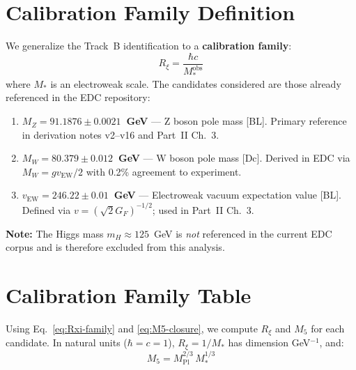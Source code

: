 \documentclass[11pt,a4paper]{article}
\newcommand{\Rxi}{R_\xi}
\newcommand{\Mpl}{M_{\mathrm{Pl}}}
\newcommand{\Mfive}{M_5}
\newcommand{\MZ}{M_Z}
\newcommand{\MW}{M_W}
\newcommand{\vEW}{v_{\mathrm{EW}}}
\begin{document}
\section{Calibration Family Definition}

We generalize the Track~B identification to a \textbf{calibration family}:
\begin{equation}
\Rxi = \frac{\hbar c}{M_*^{\mathrm{obs}}}
\label{eq:Rxi-family}
\end{equation}
where $M_*$ is an electroweak scale. The candidates considered are those already
referenced in the EDC repository:

\begin{enumerate}
\item \textbf{$\MZ = 91.1876 \pm 0.0021$~GeV} --- Z boson pole mass [BL].
      Primary reference in derivation notes v2--v16 and Part~II Ch.~3.
\item \textbf{$\MW = 80.379 \pm 0.012$~GeV} --- W boson pole mass [Dc].
      Derived in EDC via $\MW = g \vEW / 2$ with 0.2\% agreement to experiment.
\item \textbf{$\vEW = 246.22 \pm 0.01$~GeV} --- Electroweak vacuum expectation value [BL].
      Defined via $v = (\sqrt{2} G_F)^{-1/2}$; used in Part~II Ch.~3.
\end{enumerate}

\textbf{Note:} The Higgs mass $m_H \approx 125$~GeV is \emph{not} referenced in the
current EDC corpus and is therefore excluded from this analysis.

\section{Calibration Family Table}

Using Eq.~\eqref{eq:Rxi-family} and \eqref{eq:M5-closure}, we compute $\Rxi$ and $\Mfive$
for each candidate. In natural units ($\hbar = c = 1$), $\Rxi = 1/M_*$ has dimension
GeV$^{-1}$, and:
\begin{equation}
\Mfive = \Mpl^{2/3} \, M_*^{1/3}
\label{eq:M5-natural}
\end{equation}
\end{document}
